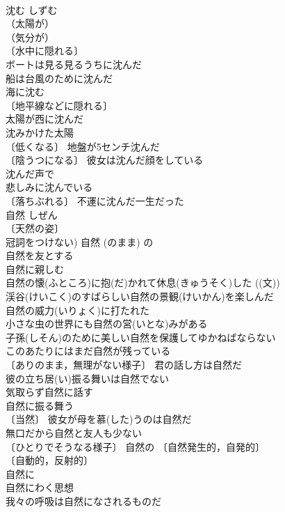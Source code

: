 \documentclass[8pt]{extreport}
\begin{document}
\begin{CJK}{UTF8}{min}
\\	沈む	しずむ	
\\	（太陽が）
\\	（気分が）
\\	〔水中に隠れる〕
\\	ボートは見る見るうちに沈んだ 
\\	船は台風のために沈んだ 
\\	海に沈む 
\\	〔地平線などに隠れる〕
\\	太陽が西に沈んだ 
\\	沈みかけた太陽 
\\	〔低くなる〕 地盤が5センチ沈んだ 
\\	〔陰うつになる〕 彼女は沈んだ顔をしている 
\\	沈んだ声で 
\\	悲しみに沈んでいる 
\\	〔落ちぶれる〕 不運に沈んだ一生だった 
\\	自然	しぜん	
\\	〔天然の姿〕
\\	冠詞をつけない) 自然 (のまま) の 
\\	自然を友とする 
\\	自然に親しむ 
\\	自然の懐(ふところ)に抱(だ)かれて休息(きゅうそく)した ((文)) 
\\	渓谷(けいこく)のすばらしい自然の景観(けいかん)を楽しんだ 
\\	自然の威力(いりょく)に打たれた 
\\	小さな虫の世界にも自然の営(いとな)みがある 
\\	子孫(しそん)のために美しい自然を保護してゆかねばならない 
\\	このあたりにはまだ自然が残っている 
\\	〔ありのまま，無理がない様子〕 君の話し方は自然だ 
\\	彼の立ち居(い)振る舞いは自然でない 
\\	気取らず自然に話す 
\\	自然に振る舞う 
\\	〔当然〕 彼女が母を慕(した)うのは自然だ 
\\	無口だから自然と友人も少ない 
\\	〔ひとりでそうなる様子〕 自然の 〔自然発生的，自発的〕
\\	〔自動的，反射的〕
\\	自然に 
\\	自然にわく思想 
\\	我々の呼吸は自然になされるものだ 

\end{CJK}
\end{document}
